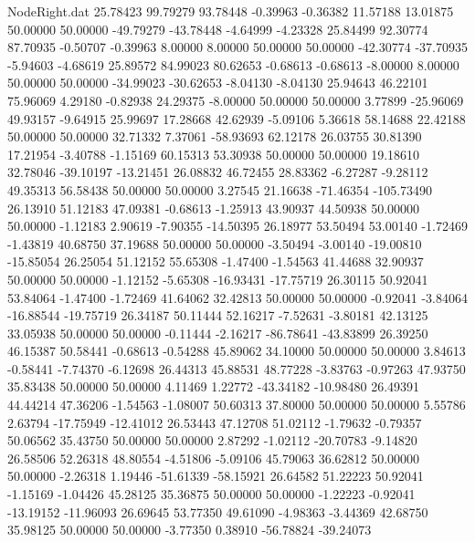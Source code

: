 \begin{filecontents}{NodeRight.dat}
  25.78423   99.79279   93.78448    -0.39963   -0.36382   11.57188   13.01875   50.00000   50.00000  -49.79279  -43.78448   -4.64999   -4.23328
  25.84499   92.30774   87.70935    -0.50707   -0.39963    8.00000    8.00000   50.00000   50.00000  -42.30774  -37.70935   -5.94603   -4.68619
  25.89572   84.99023   80.62653    -0.68613   -0.68613   -8.00000    8.00000   50.00000   50.00000  -34.99023  -30.62653   -8.04130   -8.04130
  25.94643   46.22101   75.96069     4.29180   -0.82938   24.29375   -8.00000   50.00000   50.00000    3.77899  -25.96069   49.93157   -9.64915
  25.99697   17.28668   42.62939    -5.09106    5.36618   58.14688   22.42188   50.00000   50.00000   32.71332    7.37061  -58.93693   62.12178
  26.03755   30.81390   17.21954    -3.40788   -1.15169   60.15313   53.30938   50.00000   50.00000   19.18610   32.78046  -39.10197  -13.21451
  26.08832   46.72455   28.83362    -6.27287   -9.28112   49.35313   56.58438   50.00000   50.00000    3.27545   21.16638  -71.46354 -105.73490
  26.13910   51.12183   47.09381    -0.68613   -1.25913   43.90937   44.50938   50.00000   50.00000   -1.12183    2.90619   -7.90355  -14.50395
  26.18977   53.50494   53.00140    -1.72469   -1.43819   40.68750   37.19688   50.00000   50.00000   -3.50494   -3.00140  -19.00810  -15.85054
  26.25054   51.12152   55.65308    -1.47400   -1.54563   41.44688   32.90937   50.00000   50.00000   -1.12152   -5.65308  -16.93431  -17.75719
  26.30115   50.92041   53.84064    -1.47400   -1.72469   41.64062   32.42813   50.00000   50.00000   -0.92041   -3.84064  -16.88544  -19.75719
  26.34187   50.11444   52.16217    -7.52631   -3.80181   42.13125   33.05938   50.00000   50.00000   -0.11444   -2.16217  -86.78641  -43.83899
  26.39250   46.15387   50.58441    -0.68613   -0.54288   45.89062   34.10000   50.00000   50.00000    3.84613   -0.58441   -7.74370   -6.12698
  26.44313   45.88531   48.77228    -3.83763   -0.97263   47.93750   35.83438   50.00000   50.00000    4.11469    1.22772  -43.34182  -10.98480
  26.49391   44.44214   47.36206    -1.54563   -1.08007   50.60313   37.80000   50.00000   50.00000    5.55786    2.63794  -17.75949  -12.41012
  26.53443   47.12708   51.02112    -1.79632   -0.79357   50.06562   35.43750   50.00000   50.00000    2.87292   -1.02112  -20.70783   -9.14820
  26.58506   52.26318   48.80554    -4.51806   -5.09106   45.79063   36.62812   50.00000   50.00000   -2.26318    1.19446  -51.61339  -58.15921
  26.64582   51.22223   50.92041    -1.15169   -1.04426   45.28125   35.36875   50.00000   50.00000   -1.22223   -0.92041  -13.19152  -11.96093
  26.69645   53.77350   49.61090    -4.98363   -3.44369   42.68750   35.98125   50.00000   50.00000   -3.77350    0.38910  -56.78824  -39.24073

\end{filecontents}
